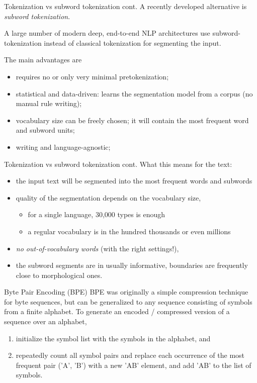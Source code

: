 \documentclass[style=upen, size=14pt]{powerdot}
\theoremstyle{definition}
\begin{document}
\begin{slide}[toc=]{Tokenization vs subword tokenization cont.}
  A recently developed alternative is \emph{subword tokenization}.

  A large number of modern deep, end-to-end NLP architectures use
  subword-tokenization instead of classical tokenization for segmenting the
  input.\bigskip

  The main advantages are
  \begin{itemize}
  \item requires no or only very minimal pretokenization;
  \item statistical and data-driven: learns the segmentation model from a corpus
        (no manual rule writing);
  \item vocabulary size can be freely chosen; it will contain the most frequent
        word and subword units;
  \item writing and language-agnostic;
  \end{itemize}
\end{slide}

\begin{slide}[toc=]{Tokenization vs subword tokenization cont.}
  What this means for the text:
  \begin{itemize}
  \item the input text will be segmented into the most frequent words and
        subwords
  \item quality of the segmentation depends on the vocabulary size,
      \begin{itemize}
      \item for a single language, 30,000 types is enough
      \item a regular vocabulary is in the hundred thousands or even millions
      \end{itemize}
  \item \textit{no out-of-vocabulary words} (with the right settings!),
  \item the subword segments are in usually informative, boundaries are
        frequently close to morphological ones.
  \end{itemize}
\end{slide}

\begin{slide}[toc=Byte Pair Encoding]{Byte Pair Encoding (BPE)}
  BPE was originally a simple compression technique for byte sequences, but can
  be generalized to any sequence consisting of symbols from a finite alphabet.
  To generate an encoded / compressed version of a sequence over an alphabet,
  \begin{enumerate}
  \item initialize the symbol list with the symbols in the alphabet, and
  \item repeatedly count all symbol pairs and replace each occurrence of the
    most frequent pair ('A', 'B') with a new 'AB' element, and add 'AB' to the
    list of symbols.
  \end{enumerate}
\end{slide}
    
\end{document}
